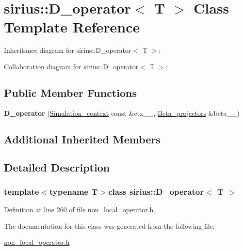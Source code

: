 \hypertarget{classsirius_1_1_d__operator}{}\section{sirius\+:\+:D\+\_\+operator$<$ T $>$ Class Template Reference}
\label{classsirius_1_1_d__operator}


Inheritance diagram for sirius\+:\+:D\+\_\+operator$<$ T $>$\+:


Collaboration diagram for sirius\+:\+:D\+\_\+operator$<$ T $>$\+:
\subsection*{Public Member Functions}
\begin{DoxyCompactItemize}
\item 
\hypertarget{classsirius_1_1_d__operator_ad5307cad47db14fc6a45ec223c607978}{}{\bfseries D\+\_\+operator} (\hyperlink{classsirius_1_1_simulation__context}{Simulation\+\_\+context} const \&ctx\+\_\+\+\_\+, \hyperlink{classsirius_1_1_beta__projectors}{Beta\+\_\+projectors} \&beta\+\_\+\+\_\+)\label{classsirius_1_1_d__operator_ad5307cad47db14fc6a45ec223c607978}

\end{DoxyCompactItemize}
\subsection*{Additional Inherited Members}


\subsection{Detailed Description}
\subsubsection*{template$<$typename T$>$class sirius\+::\+D\+\_\+operator$<$ T $>$}



Definition at line 260 of file non\+\_\+local\+\_\+operator.\+h.



The documentation for this class was generated from the following file\+:\begin{DoxyCompactItemize}
\item 
\hyperlink{non__local__operator_8h}{non\+\_\+local\+\_\+operator.\+h}\end{DoxyCompactItemize}
